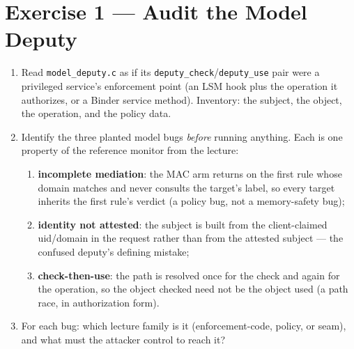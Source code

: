 \documentclass[12pt]{Training}
\begin{document}
\section*{Exercise 1 --- Audit the Model Deputy}
\begin{enumerate}
    \item Read \lstinline{model_deputy.c} as if its \lstinline{deputy_check}/\lstinline{deputy_use} pair were a privileged service's enforcement point (an LSM hook plus the operation it authorizes, or a Binder service method). Inventory: the subject, the object, the operation, and the policy data.
    \item Identify the three planted model bugs \emph{before} running anything. Each is one property of the reference monitor from the lecture:
    \begin{enumerate}
        \item \textbf{incomplete mediation}: the MAC arm returns on the first rule whose domain matches and never consults the target's label, so every target inherits the first rule's verdict (a policy bug, not a memory-safety bug);
        \item \textbf{identity not attested}: the subject is built from the client-claimed uid/domain in the request rather than from the attested subject --- the confused deputy's defining mistake;
        \item \textbf{check-then-use}: the path is resolved once for the check and again for the operation, so the object checked need not be the object used (a path race, in authorization form).
    \end{enumerate}
    \item For each bug: which lecture family is it (enforcement-code, policy, or seam), and what must the attacker control to reach it?
\end{enumerate}
\end{document}

